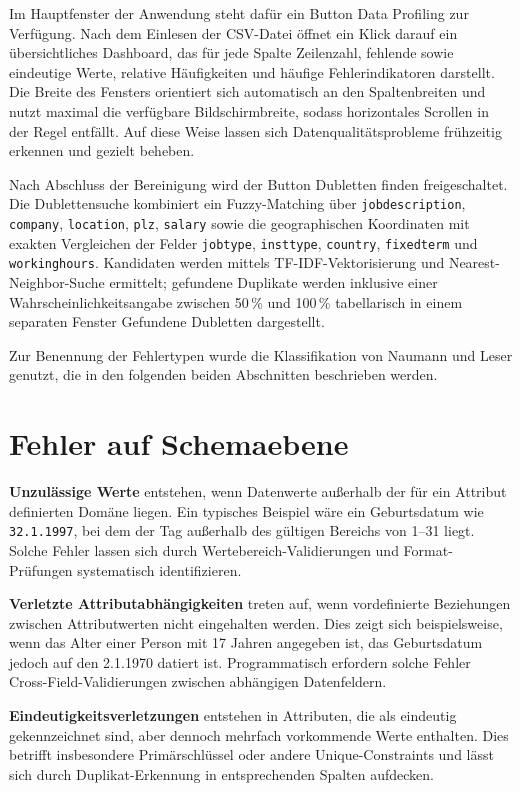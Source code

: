 \documentclass[
    a4paper,
    12pt,
    headinclude=true,
    BCOR=10mm,
]{scrreprt}
\begin{document}
Im Hauptfenster der Anwendung steht dafür ein Button \glqq Data Profiling\grqq{} zur Verfügung. Nach dem Einlesen der CSV-Datei öffnet ein Klick darauf ein übersichtliches Dashboard, das für jede Spalte Zeilenzahl, fehlende sowie eindeutige Werte, relative Häufigkeiten und häufige Fehlerindikatoren darstellt. Die Breite des Fensters orientiert sich automatisch an den Spaltenbreiten und nutzt maximal die verfügbare Bildschirmbreite, sodass horizontales Scrollen in der Regel entfällt. Auf diese Weise lassen sich Datenqualitätsprobleme frühzeitig erkennen und gezielt beheben.

Nach Abschluss der Bereinigung wird der Button \glqq Dubletten finden\grqq{} freigeschaltet. Die Dublettensuche kombiniert ein Fuzzy-Matching über \texttt{jobdescription}, \texttt{company}, \texttt{location}, \texttt{plz}, \texttt{salary} sowie die geographischen Koordinaten mit exakten Vergleichen der Felder \texttt{jobtype}, \texttt{insttype}, \texttt{country}, \texttt{fixedterm} und \texttt{workinghours}. Kandidaten werden mittels TF-IDF-Vektorisierung und Nearest-Neighbor-Suche ermittelt; gefundene Duplikate werden inklusive einer Wahrscheinlichkeitsangabe zwischen 50\,\% und 100\,\% tabellarisch in einem separaten Fenster \glqq Gefundene Dubletten\grqq{} dargestellt.

Zur Benennung der Fehlertypen wurde die Klassifikation von Naumann und Leser genutzt, die in den folgenden beiden Abschnitten beschrieben werden.

\section{Fehler auf Schemaebene}

\textbf{Unzulässige Werte} entstehen, wenn Datenwerte außerhalb der für ein Attribut definierten Domäne liegen. Ein typisches Beispiel wäre ein Geburtsdatum wie \texttt{32.1.1997}, bei dem der Tag außerhalb des gültigen Bereichs von 1--31 liegt. Solche Fehler lassen sich durch Wertebereich-Validierungen und Format-Prüfungen systematisch identifizieren.

\textbf{Verletzte Attributabhängigkeiten} treten auf, wenn vordefinierte Beziehungen zwischen Attributwerten nicht eingehalten werden. Dies zeigt sich beispielsweise, wenn das Alter einer Person mit 17 Jahren angegeben ist, das Geburtsdatum jedoch auf den 2.1.1970 datiert ist. Programmatisch erfordern solche Fehler Cross-Field-Validierungen zwischen abhängigen Datenfeldern.

\textbf{Eindeutigkeitsverletzungen} entstehen in Attributen, die als eindeutig gekennzeichnet sind, aber dennoch mehrfach vorkommende Werte enthalten. Dies betrifft insbesondere Primärschlüssel oder andere Unique-Constraints und lässt sich durch Duplikat-Erkennung in entsprechenden Spalten aufdecken.
\end{document}
